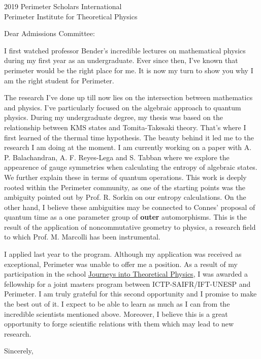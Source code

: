 \documentclass{letter}
\begin{document}
\begin{letter}{2019 Perimeter Scholars International \\ Perimeter Institute for Theoretical Physics}

\opening{Dear Admissions Committee:}

I first watched professor Bender's incredible lectures on mathematical physics during my first year as an undergraduate. Ever since then, I've known that perimeter would be the right place for me. It is now my turn to show you why I am the right student for Perimeter.

The research I've done up till now lies on the intersection between mathematics and physics. I've particularly focused on the algebraic approach to quantum physics. During my undergraduate degree, my thesis was based on the relationship between KMS states and Tomita-Takesaki theory. That's where I first learned of the thermal time hypothesis. The beauty behind it led me to the research I am doing at the moment. I am currently working on a paper with A. P. Balachandran, A. F. Reyes-Lega and S. Tabban where we explore the appearence of gauge symmetries when calculating the entropy of algebraic states. We further explain these in terms of quantum operations. This work is deeply rooted within the Perimeter community, as one of the starting points was the ambiguity pointed out by Prof. R. Sorkin on our entropy calculations. On the other hand, I believe these ambiguities may be connected to Connes' proposal of quantum time as a one parameter group of {\bf outer} automorphisms. This is the result of the application of noncommutative geometry to physics, a research field to which Prof. M. Marcolli has been instrumental.

I applied last year to the program. Although my application was received as exceptional, Perimeter was unable to offer me a position. As a result of my participation in the school \href{http://journeys.ictp-saifr.org/}{Journeys into Theoretical Physics}, I was awarded a fellowship for a joint masters program between ICTP-SAIFR/IFT-UNESP and Perimeter. I am truly grateful for this second opportunity and I promise to make the best out of it. I expect to be able to learn as much as I can from the incredible scientists mentioned above. Moreover, I believe this is a great opportunity to forge scientific relations with them which may lead to new research.

\closing{Sincerely,}

\end{letter}
\end{document}
